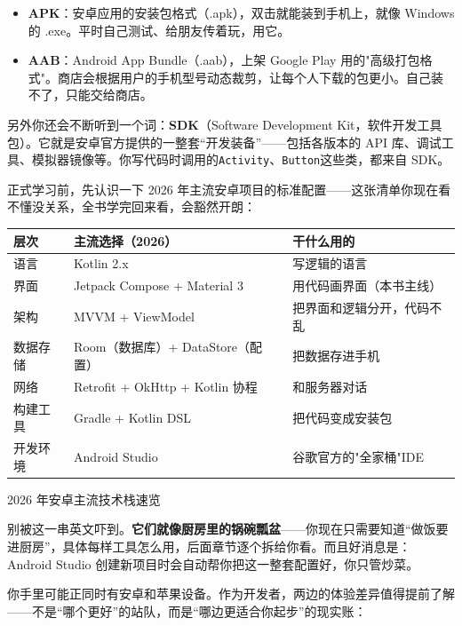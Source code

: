 \begin{itemize}
  \item \textbf{APK}：安卓应用的安装包格式（.apk），双击就能装到手机上，就像 Windows 的 .exe。平时自己测试、给朋友传着玩，用它。
  \item \textbf{AAB}：Android App Bundle（.aab），上架 Google Play 用的"高级打包格式"。商店会根据用户的手机型号动态裁剪，让每个人下载的包更小。自己装不了，只能交给商店。
\end{itemize}

另外你还会不断听到一个词：\textbf{SDK}（Software Development Kit，软件开发工具包）。它就是安卓官方提供的一整套“开发装备”——包括各版本的 API 库、调试工具、模拟器镜像等。你写代码时调用的\texttt{Activity}、\texttt{Button}这些类，都来自 SDK。


正式学习前，先认识一下 2026 年主流安卓项目的标准配置——这张清单你现在看不懂没关系，全书学完回来看，会豁然开朗：

\begin{center}
\begin{tabularx}{\linewidth}{|X|X|X|}
\hline
\textbf{层次} & \textbf{主流选择（2026）} & \textbf{干什么用的} \tabularnewline
\hline
语言 & Kotlin 2.x & 写逻辑的语言 \tabularnewline
界面 & Jetpack Compose + Material 3 & 用代码画界面（本书主线） \tabularnewline
架构 & MVVM + ViewModel & 把界面和逻辑分开，代码不乱 \tabularnewline
数据存储 & Room（数据库）+ DataStore（配置） & 把数据存进手机 \tabularnewline
网络 & Retrofit + OkHttp + Kotlin 协程 & 和服务器对话 \tabularnewline
构建工具 & Gradle + Kotlin DSL & 把代码变成安装包 \tabularnewline
开发环境 & Android Studio & 谷歌官方的"全家桶"IDE \tabularnewline
\hline
\end{tabularx}
\end{center}

\begin{center}\small\color{gray}2026 年安卓主流技术栈速览\end{center}

别被这一串英文吓到。\textbf{它们就像厨房里的锅碗瓢盆}——你现在只需要知道“做饭要进厨房”，具体每样工具怎么用，后面章节逐个拆给你看。而且好消息是：Android Studio 创建新项目时会自动帮你把这一整套配置好，你只管炒菜。


你手里可能正同时有安卓和苹果设备。作为开发者，两边的体验差异值得提前了解——不是“哪个更好”的站队，而是“哪边更适合你起步”的现实账：

